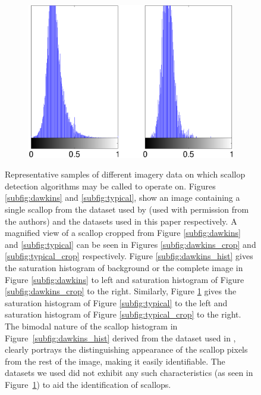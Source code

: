\documentclass {udthesis}
\begin{document}
\begin{figure}
\begin{minipage}[c]{\textwidth}
\begin{subfigure}[]{0.35\textwidth}
	\includegraphics[width=\textwidth]{our_hist_sat}
	\caption{}
	\label{subfig:typical_hist}
    \end{subfigure}
  \end{minipage}
  \caption{Representative samples of different imagery data on which
  scallop detection algorithms may be called to operate on.  Figures \ref{subfig:dawkins}
  and \ref{subfig:typical},
  show an image containing a single scallop from the dataset used by
  \cite{dawkings13} (used with permission from the authors) 
  and the datasets used in this paper respectively.
  A magnified
  view of a scallop cropped from Figure \ref{subfig:dawkins} 
  and \ref{subfig:typical} can be seen in Figures \ref{subfig:dawkins_crop} 
  and \ref{subfig:typical_crop} respectively.
  Figure \ref{subfig:dawkins_hist} 
  gives the saturation histogram of background or the complete 
  image in Figure \ref{subfig:dawkins} to left and 
  saturation histogram of Figure \ref{subfig:dawkins_crop} to the right.
  Similarly, Figure \ref{subfig:typical_hist} 
  gives the saturation histogram of Figure \ref{subfig:typical} to the left and 
  saturation histogram of Figure \ref{subfig:typical_crop} to the right. The bimodal 
  nature of the scallop histogram
  in Figure~\ref{subfig:dawkins_hist} 
  derived from the dataset used in \cite{dawkings13}, clearly portrays the distinguishing appearance of the scallop pixels from the rest of the image, making it easily identifiable. The datasets we
  used did not exhibit any such characteristics (as seen in Figure~\ref{subfig:typical_hist}) 
  to aid the identification of scallops.}
  \label{data-difference} 
\end{figure}
\end{document}
